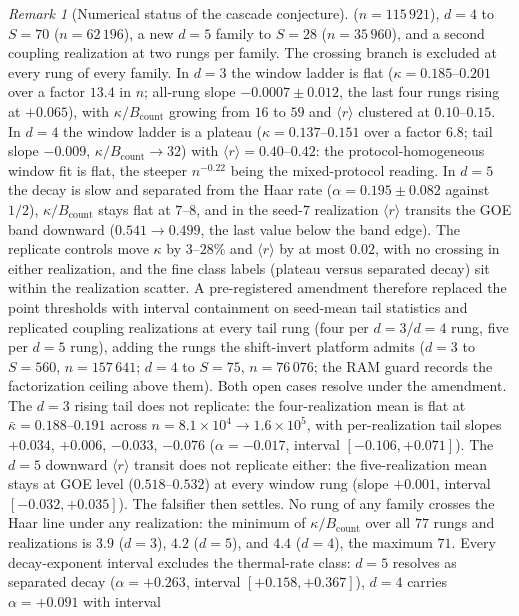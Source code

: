 \documentclass[11pt,a4paper]{article}
\theoremstyle{plain}
\theoremstyle{definition}
\theoremstyle{remark}
\newtheorem{remark}[theorem]{Remark}
\begin{document}
\begin{remark}[Numerical status of the cascade conjecture]
($n=115\,921$), $d=4$ to $S=70$ ($n=62\,196$), a new $d=5$ family to
$S=28$ ($n=35\,960$), and a second coupling realization at two rungs per
family. The crossing branch is excluded at every rung of every family. In
$d=3$ the window ladder is flat ($\kappa=0.185$--$0.201$ over a factor
$13.4$ in $n$; all-rung slope $-0.0007\pm0.012$, the last four rungs
rising at $+0.065$), with $\kappa/B_{\mathrm{count}}$ growing from $16$
to $59$ and $\langle r\rangle$ clustered at $0.10$--$0.15$. In $d=4$ the
window ladder is a plateau ($\kappa=0.137$--$0.151$ over a factor $6.8$;
tail slope $-0.009$, $\kappa/B_{\mathrm{count}}\to32$) with $\langle
r\rangle=0.40$--$0.42$: the protocol-homogeneous window fit is flat, the
steeper $n^{-0.22}$ being the mixed-protocol reading. In $d=5$ the decay
is slow and separated from the Haar rate ($\alpha=0.195\pm0.082$
against $1/2$), $\kappa/B_{\mathrm{count}}$ stays flat at $7$--$8$, and
in the seed-$7$ realization $\langle r\rangle$ transits the GOE band
downward ($0.541\to0.499$, the last value below the band edge). The
replicate controls move
$\kappa$ by $3$--$28\%$ and $\langle r\rangle$ by at most $0.02$, with
no crossing in either realization, and the fine class labels (plateau
versus separated decay) sit within the realization scatter. A
pre-registered amendment therefore replaced the point thresholds with
interval containment on seed-mean tail statistics and replicated
coupling realizations at every tail rung (four per $d=3$/$d=4$ rung,
five per $d=5$ rung), adding the rungs the shift-invert platform admits
($d=3$ to $S=560$, $n=157\,641$; $d=4$ to $S=75$, $n=76\,076$; the RAM
guard records the factorization ceiling above them). Both open cases
resolve under the amendment. The $d=3$ rising tail does not replicate:
the four-realization mean is flat at $\bar\kappa=0.188$--$0.191$ across
$n=8.1\times10^{4}\to1.6\times10^{5}$, with per-realization tail slopes
$+0.034$, $+0.006$, $-0.033$, $-0.076$ ($\alpha=-0.017$, interval
$[-0.106,+0.071]$). The $d=5$ downward $\langle r\rangle$ transit does
not replicate either: the five-realization mean stays at GOE level
($0.518$--$0.532$) at every window rung (slope $+0.001$, interval
$[-0.032,+0.035]$). The falsifier then settles. No rung of any family
crosses the Haar line under any realization: the minimum of
$\kappa/B_{\mathrm{count}}$ over all $77$ rungs and realizations is
$3.9$ ($d=3$), $4.2$ ($d=5$), and $4.4$ ($d=4$), the maximum $71$.
Every decay-exponent interval excludes the thermal-rate class: $d=5$
resolves as separated decay ($\alpha=+0.263$, interval $[+0.158,
+0.367]$), $d=4$ carries $\alpha=+0.091$ with interval

\end{remark}
\end{document}
